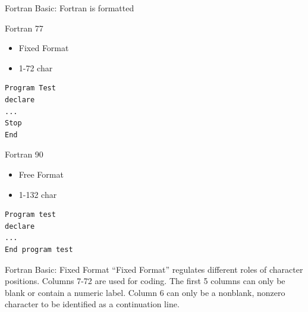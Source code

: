\documentclass[10pt, xcolor = svgnames]{beamer} %
\begin{document}
\begin{frame}[fragile]{Fortran Basic: Fortran is formatted}

\begin{minipage}{0.45\textwidth}
Fortran 77
\begin{itemize}
	\item Fixed Format
	\item 1-72 char
\end{itemize}
\begin{lstlisting}
Program Test
declare
...
Stop
End
\end{lstlisting}
\end{minipage}
\hspace{20pt}
\begin{minipage}{0.45\textwidth}
Fortran 90
\begin{itemize}
	\item Free Format
	\item 1-132 char
\end{itemize}
\begin{lstlisting}
Program test
declare
...
End program test
\end{lstlisting}
\end{minipage}
\end{frame}

\begin{frame}[fragile]{Fortran Basic: Fixed Format}
``Fixed Format'' regulates different roles of character positions. Columns 7-72 are used for coding. The first 5 columns can only be blank or contain a numeric label. Column 6 can only be a nonblank, nonzero character to be identified as a  continuation line.
\end{frame}
\end{document}
